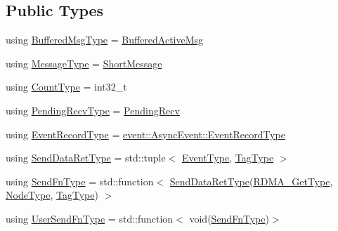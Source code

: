 \subsection*{Public Types}
\begin{DoxyCompactItemize}
\item 
using \hyperlink{structvt_1_1messaging_1_1_active_messenger_a80a9cbda399d7bf035bfcecc761f4b02}{Buffered\+Msg\+Type} = \hyperlink{structvt_1_1messaging_1_1_buffered_active_msg}{Buffered\+Active\+Msg}
\item 
using \hyperlink{structvt_1_1messaging_1_1_active_messenger_a720a2b1e7462d414b2a51d9fe005eca9}{Message\+Type} = \hyperlink{namespacevt_a1125ac1da6c0bbf141e0ea0739d7602d}{Short\+Message}
\item 
using \hyperlink{structvt_1_1messaging_1_1_active_messenger_aa69cbede6a9fbc4d727bfb38d5546600}{Count\+Type} = int32\+\_\+t
\item 
using \hyperlink{structvt_1_1messaging_1_1_active_messenger_add1d7ab7bf168d53dfe7b93f29f64f02}{Pending\+Recv\+Type} = \hyperlink{structvt_1_1messaging_1_1_pending_recv}{Pending\+Recv}
\item 
using \hyperlink{structvt_1_1messaging_1_1_active_messenger_aed736a2b2eaa0f96971a4f0be3fe0a25}{Event\+Record\+Type} = \hyperlink{structvt_1_1event_1_1_async_event_a5b4ef37db6e5962fdc0e6e0e56e74bc1}{event\+::\+Async\+Event\+::\+Event\+Record\+Type}
\item 
using \hyperlink{structvt_1_1messaging_1_1_active_messenger_a839987e944b6b9c681bc56efbea1f220}{Send\+Data\+Ret\+Type} = std\+::tuple$<$ \hyperlink{namespacevt_a009267401def7ae8bf201892222d060f}{Event\+Type}, \hyperlink{namespacevt_a84ab281dae04a52a4b243d6bf62d0e52}{Tag\+Type} $>$
\item 
using \hyperlink{structvt_1_1messaging_1_1_active_messenger_a9821bc2d924729107f08fadf5a217537}{Send\+Fn\+Type} = std\+::function$<$ \hyperlink{structvt_1_1messaging_1_1_active_messenger_a839987e944b6b9c681bc56efbea1f220}{Send\+Data\+Ret\+Type}(\hyperlink{namespacevt_a1cab7f4860f65a49ad2c042d6240f288}{R\+D\+M\+A\+\_\+\+Get\+Type}, \hyperlink{namespacevt_a866da9d0efc19c0a1ce79e9e492f47e2}{Node\+Type}, \hyperlink{namespacevt_a84ab281dae04a52a4b243d6bf62d0e52}{Tag\+Type}) $>$
\item 
using \hyperlink{structvt_1_1messaging_1_1_active_messenger_a4b1993ad77436b6ed6c7fd32801c50ed}{User\+Send\+Fn\+Type} = std\+::function$<$ void(\hyperlink{structvt_1_1messaging_1_1_active_messenger_a9821bc2d924729107f08fadf5a217537}{Send\+Fn\+Type})$>$
\item 

\end{DoxyCompactItemize}
